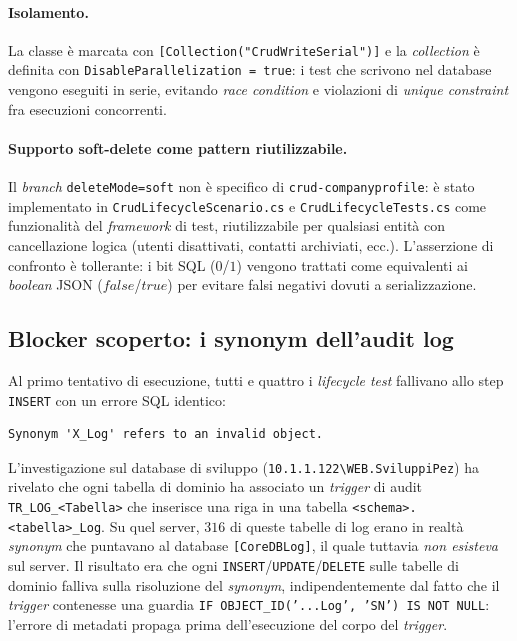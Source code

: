 \paragraph{Isolamento.} La classe è marcata con \texttt{[Collection("CrudWriteSerial")]} e la \emph{collection} è definita con \texttt{DisableParallelization = true}: i test che scrivono nel database vengono eseguiti in serie, evitando \emph{race condition} e violazioni di \emph{unique constraint} fra esecuzioni concorrenti.

\paragraph{Supporto soft-delete come pattern riutilizzabile.} Il \emph{branch} \texttt{deleteMode=soft} non è specifico di \texttt{crud-companyprofile}: è stato implementato in \texttt{CrudLifecycleScenario.cs} e \texttt{CrudLifecycleTests.cs} come funzionalità del \emph{framework} di test, riutilizzabile per qualsiasi entità con cancellazione logica (utenti disattivati, contatti archiviati, ecc.). L'asserzione di confronto è tollerante: i bit SQL ($0$/$1$) vengono trattati come equivalenti ai \emph{boolean} JSON ($\mathit{false}$/$\mathit{true}$) per evitare falsi negativi dovuti a serializzazione.

\subsection{Blocker scoperto: i synonym dell'audit log}

Al primo tentativo di esecuzione, tutti e quattro i \emph{lifecycle test} fallivano allo step \texttt{INSERT} con un errore SQL identico:

\begin{verbatim}
Synonym 'X_Log' refers to an invalid object.
\end{verbatim}

L'investigazione sul database di sviluppo (\texttt{10.1.1.122\textbackslash WEB.SviluppiPez}) ha rivelato che ogni tabella di dominio ha associato un \emph{trigger} di audit \texttt{TR\_LOG\_<Tabella>} che inserisce una riga in una tabella \texttt{<schema>.<tabella>\_Log}. Su quel server, $316$ di queste tabelle di log erano in realtà \emph{synonym} che puntavano al database \texttt{[CoreDBLog]}, il quale tuttavia \emph{non esisteva} sul server. Il risultato era che ogni \texttt{INSERT}/\texttt{UPDATE}/\texttt{DELETE} sulle tabelle di dominio falliva sulla risoluzione del \emph{synonym}, indipendentemente dal fatto che il \emph{trigger} contenesse una guardia \texttt{IF OBJECT\_ID('...Log', 'SN') IS NOT NULL}: l'errore di metadati propaga prima dell'esecuzione del corpo del \emph{trigger}.


